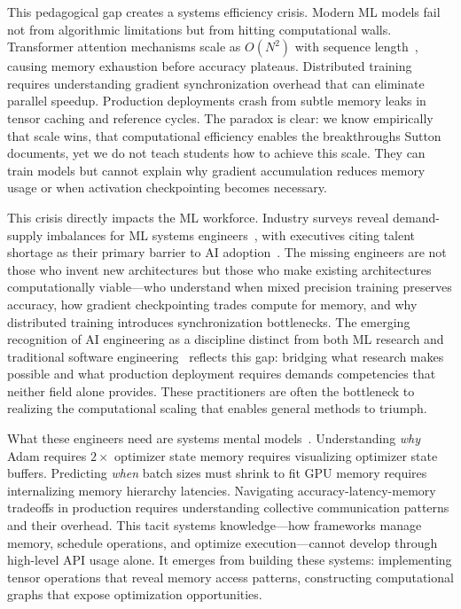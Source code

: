 \documentclass[10pt,twocolumn]{article}
\begin{document}
This pedagogical gap creates a systems efficiency crisis. Modern ML models fail not from algorithmic limitations but from hitting computational walls. Transformer attention mechanisms scale as $O(N^2)$ with sequence length~\citep{vaswani2017attention}, causing memory exhaustion before accuracy plateaus. Distributed training requires understanding gradient synchronization overhead that can eliminate parallel speedup. Production deployments crash from subtle memory leaks in tensor caching and reference cycles. The paradox is clear: we know empirically that scale wins, that computational efficiency enables the breakthroughs Sutton documents, yet we do not teach students how to achieve this scale. They can train models but cannot explain why gradient accumulation reduces memory usage or when activation checkpointing becomes necessary.

This crisis directly impacts the ML workforce. Industry surveys reveal demand-supply imbalances for ML systems engineers~\citep{roberthalf2024talent,keller2025ai}, with executives citing talent shortage as their primary barrier to AI adoption~\citep{keller2025ai}. The missing engineers are not those who invent new architectures but those who make existing architectures computationally viable---who understand when mixed precision training preserves accuracy, how gradient checkpointing trades compute for memory, and why distributed training introduces synchronization bottlenecks. The emerging recognition of AI engineering as a discipline distinct from both ML research and traditional software engineering~\citep{sei2020aieng} reflects this gap: bridging what research makes possible and what production deployment requires demands competencies that neither field alone provides. These practitioners are often the bottleneck to realizing the computational scaling that enables general methods to triumph.

What these engineers need are systems mental models~\citep{meadows2008thinking}. Understanding \emph{why} Adam requires $2\times$ optimizer state memory requires visualizing optimizer state buffers. Predicting \emph{when} batch sizes must shrink to fit GPU memory requires internalizing memory hierarchy latencies. Navigating accuracy-latency-memory tradeoffs in production requires understanding collective communication patterns and their overhead. This tacit systems knowledge---how frameworks manage memory, schedule operations, and optimize execution---cannot develop through high-level API usage alone. It emerges from building these systems: implementing tensor operations that reveal memory access patterns, constructing computational graphs that expose optimization opportunities.
\end{document}
